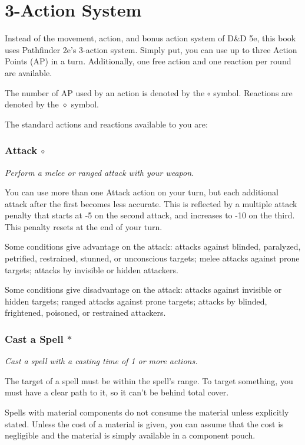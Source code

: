 \section{3-Action System} \label{sec::3actionsystem}

Instead of the movement, action, and bonus action system of D\&D 5e, this book uses Pathfinder 2e's 3-action system.
Simply put, you can use up to three Action Points (AP) in a turn.
Additionally, one free action and one reaction per round are available.

The number of AP used by an action is denoted by the $\circ$ symbol.
Reactions are denoted by the $\diamond$ symbol.

The standard actions and reactions available to you are:
\subsubsection{Attack $\circ$}
    \textit{Perform a melee or ranged attack with your weapon.}

    You can use more than one Attack action on your turn, but each additional attack after the first becomes less accurate.
    This is reflected by a multiple attack penalty that starts at -5 on the second attack, and increases to -10 on the third.
    This penalty resets at the end of your turn.

    Some conditions give advantage on the attack: attacks against blinded, paralyzed, petrified, restrained, stunned, or unconscious targets; melee attacks against prone targets; attacks by invisible or hidden attackers.

    Some conditions give disadvantage on the attack: attacks against invisible or hidden targets; ranged attacks against prone targets; attacks by blinded, frightened, poisoned, or restrained attackers.
\subsubsection{Cast a Spell $\ast$}
    \textit{Cast a spell with a casting time of 1 or more actions.}

    The target of a spell must be within the spell's range.
    To target something, you must have a clear path to it, so it can't be behind total cover.

    Spells with material components do not consume the material unless explicitly stated.
    Unless the cost of a material is given, you can assume that the cost is negligible and the material is simply available in a component pouch.

